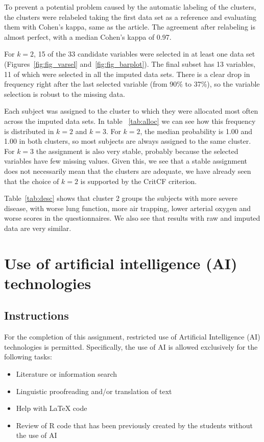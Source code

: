 \documentclass[a4paper,10pt]{article}\usepackage[]{graphicx}\usepackage[]{xcolor}
\begin{document}
To prevent a potential problem caused by the automatic labeling of the clusters, the clusters were relabeled taking the first data set as a reference and evaluating them with Cohen's kappa, same as the article. The agreement after relabeling is almost perfect, with a median Cohen's kappa of 0.97.

For $k=2$, 15 of the 33 candidate variables were selected in at least one data set (Figures~\ref{fig:fig_varsel} and~\ref{fig:fig_barplot}). The final subset has 13 variables, 11 of which were selected in all the imputed data sets.
There is a clear drop in frequency right after the last selected variable (from 90\% to 37\%), so the variable selection is robust to the missing data.

Each subject was assigned to the cluster to which they were allocated most often across the imputed data sets.  In table ~\ref{tab:alloc} we can see how this frequency is distributed in  $k = 2$ and  $k = 3$. For $k = 2$, the median probability is 1.00 and 1.00 in both clusters, so most subjects are always assigned to the same cluster.   For $k=3$ the assignment is also very stable, probably because the selected variables have few missing values. Given this, we see that a stable assignment does not necessarily mean that the clusters are adequate, we have already seen that the choice of $k = 2$ is supported by the CritCF criterion.

Table~\ref{tab:desc} shows that cluster 2 groups the subjects with more severe disease, with worse lung function, more air trapping, lower arterial oxygen and worse scores in the questionnaires. We also see that results with raw and imputed data are very similar.



\section{Use of artificial intelligence (AI) technologies}

\subsection{Instructions}

For the completion of this assignment, restricted use of Artificial Intelligence (AI) technologies is permitted. Specifically, the use of AI is allowed exclusively for the following tasks:

\begin{itemize}
    \item Literature or information search
    \item Linguistic proofreading and/or translation of text
    \item Help with \LaTeX{} code
    \item Review of R code that has been previously created by the students without the use of AI
\end{itemize}
\end{document}
